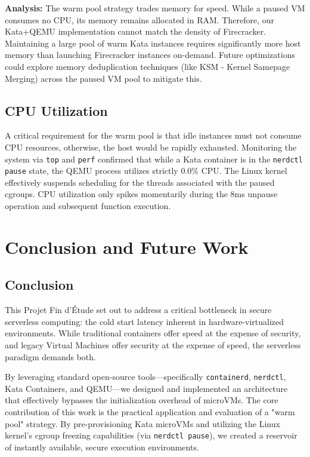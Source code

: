 \documentclass[12pt,a4paper]{report}
\begin{document}
\textbf{Analysis:} The warm pool strategy trades memory for speed. While a paused VM consumes no CPU, its memory remains allocated in RAM. Therefore, our Kata+QEMU implementation cannot match the density of Firecracker. Maintaining a large pool of warm Kata instances requires significantly more host memory than launching Firecracker instances on-demand. Future optimizations could explore memory deduplication techniques (like KSM - Kernel Samepage Merging) across the paused VM pool to mitigate this.

\section{CPU Utilization}
A critical requirement for the warm pool is that idle instances must not consume CPU resources, otherwise, the host would be rapidly exhausted.
Monitoring the system via \texttt{top} and \texttt{perf} confirmed that while a Kata container is in the \texttt{nerdctl pause} state, the QEMU process utilizes strictly 0.0\% CPU. The Linux kernel effectively suspends scheduling for the threads associated with the paused cgroups. CPU utilization only spikes momentarily during the 8ms unpause operation and subsequent function execution.

\vspace{1cm}
\lipsum[61-80]

\clearpage{}
\clearpage{}\chapter{Conclusion and Future Work}

\section{Conclusion}
This Projet Fin d'\'Etude set out to address a critical bottleneck in secure serverless computing: the cold start latency inherent in hardware-virtualized environments. While traditional containers offer speed at the expense of security, and legacy Virtual Machines offer security at the expense of speed, the serverless paradigm demands both.

By leveraging standard open-source tools---specifically \texttt{containerd}, \texttt{nerdctl}, Kata Containers, and QEMU---we designed and implemented an architecture that effectively bypasses the initialization overhead of microVMs. The core contribution of this work is the practical application and evaluation of a "warm pool" strategy. By pre-provisioning Kata microVMs and utilizing the Linux kernel's cgroup freezing capabilities (via \texttt{nerdctl pause}), we created a reservoir of instantly available, secure execution environments.
\end{document}
